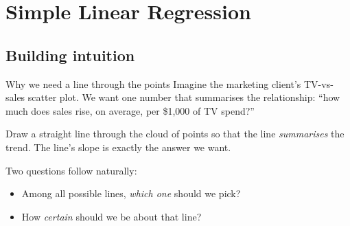 \documentclass[aspectratio=169,11pt]{beamer}
\begin{document}
\section{Simple Linear Regression}
\subsection{Building intuition}

\begin{frame}{Why we need a line through the points}
  Imagine the marketing client's TV-vs-sales scatter plot. We want one
  number that summarises the relationship: ``how much does sales rise,
  on average, per \$1{,}000 of TV spend?''
  \begin{takeaway}
    Draw a straight line through the cloud of points so that the line
    \emph{summarises} the trend. The line's slope is exactly the answer
    we want.
  \end{takeaway}
  Two questions follow naturally:
  \begin{itemize}
    \item Among all possible lines, \emph{which one} should we pick?
    \item How \emph{certain} should we be about that line?
  \end{itemize}
\end{frame}
\end{document}
